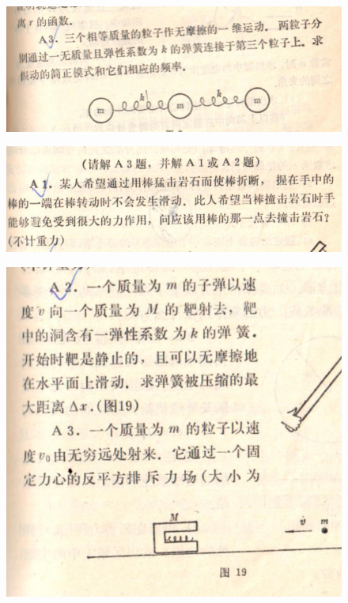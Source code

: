 \documentclass[10pt,a4paper]{article}
\begin{document}
 \newpage
\begin{figure}[H]
 \centering
 \includegraphics[width=16cm]{pdf/1-1T21.png}
\end{figure}
 \newpage
\begin{figure}[H]
 \centering
 \includegraphics[width=16cm]{pdf/1-1T22.png}
\end{figure}
 \newpage
\begin{figure}[H]
 \centering
 \includegraphics[width=16cm]{pdf/1-1T23.png}
\end{figure}
\end{document}
